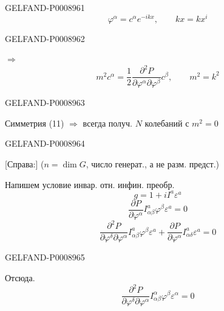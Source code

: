 \begin{GelfandAdjacentEvidence}{GELFAND-P000896}{1}
\begin{equation*}
\varphi^\alpha=c^\alpha e^{-ikx},\qquad kx=kx^i \tag{17}
\end{equation*}
\end{GelfandAdjacentEvidence}
\begin{GelfandAdjacentEvidence}{GELFAND-P000896}{2}

$\Rightarrow$
\begin{equation*}
m^2 c^\alpha=\frac12
\frac{\partial^2P}{\partial\varphi^\alpha\partial\varphi^\beta}c^\beta,
\qquad m^2=k^2
\tag{18}
\end{equation*}
\end{GelfandAdjacentEvidence}
\begin{GelfandAdjacentEvidence}{GELFAND-P000896}{3}


Симметрия (11) $\Rightarrow$ всегда получ. $N$ колебаний с $m^2=0$
\end{GelfandAdjacentEvidence}
\begin{GelfandAdjacentEvidence}{GELFAND-P000896}{4}


[Справа:] ($n=\dim G$, число генерат., а не разм. предст.)

Напишем условие инвар. отн. инфин. преобр.
\begin{equation*}
g=1+iI^a\varepsilon^a \tag{19}
\end{equation*}
\begin{equation*}
\frac{\partial P}{\partial\varphi^\alpha}
 I^a_{\alpha\beta}\varphi^\beta\varepsilon^a=0 \tag{20}
\end{equation*}
\begin{equation*}
\frac{\partial^2 P}{\partial\varphi^\delta\partial\varphi^\alpha}
 I^a_{\alpha\beta}\varphi^\beta\varepsilon^a+
 \frac{\partial P}{\partial\varphi^\alpha}I^a_{\alpha\delta}\varepsilon^a=0
\tag{21}
\end{equation*}
\end{GelfandAdjacentEvidence}
\begin{GelfandAdjacentEvidence}{GELFAND-P000896}{5}


Отсюда.
\begin{equation*}
\frac{\partial^2 P}{\partial\varphi^\delta\partial\varphi^\alpha}
 I^\alpha_{\alpha\beta}\varphi^\beta\varepsilon^\alpha=0 \tag{22}
\end{equation*}
\end{GelfandAdjacentEvidence}
